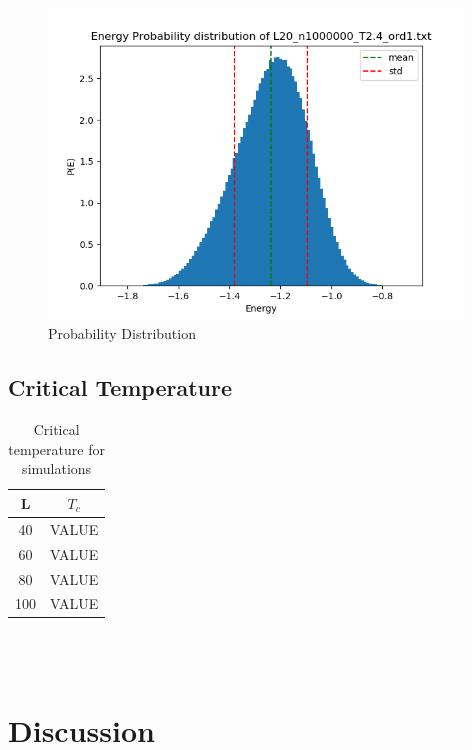 \documentclass{article}
\begin{document}
\begin{figure}[ht]
    \centering
    \includegraphics[width = 11cm]{img/energyhistogram_L20_n1000000_T24_ord1.png}
    \caption{Probability Distribution}
    \label{fig:prob-highT-ord1}
  \end{figure}

\subsection{Critical Temperature}

  \begin{table}[ht]
    \centering
    \caption{Critical temperature for simulations}
    \vspace{2mm}
    \label{tab:analytical}
    \begin{tabular}{|c|c|}
        \hline
         L & $T_c$\\
        \hline \hline
        40 & VALUE \\
        60 & VALUE \\
        80 & VALUE \\
        100 & VALUE \\
        \hline
    \end{tabular} \\
    \hspace{0pt}\\
  \end{table}

\vspace{1cm}

\clearpage
\newpage

\section{Discussion} \label{sec:Discussion}
\end{document}
